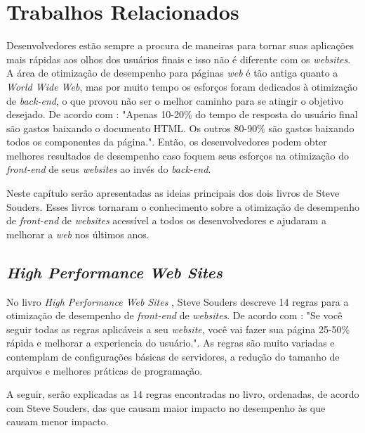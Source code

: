 %
%

\chapter{Trabalhos Relacionados}
Desenvolvedores estão sempre a procura de maneiras para tornar suas aplicações mais rápidas aos olhos dos usuários finais e isso não é diferente com os \textit{websites}. A área de otimização de desempenho para páginas \textit{web} é tão antiga quanto a \textit{World Wide Web}, mas por muito tempo os esforços foram dedicados à otimização de \textit{back-end}, o que \cite{HighPerformance} provou não ser o melhor caminho para se atingir o objetivo desejado. De acordo com : "Apenas 10-20\% do tempo de resposta do usuário final são gastos baixando o documento HTML. Os outros 80-90\% são gastos baixando todos os componentes da página.". Então, os desenvolvedores podem obter melhores resultados de desempenho caso foquem seus esforços na otimização do \textit{front-end} de seus \textit{websites} ao invés do \textit{back-end}.

Neste capítulo serão apresentadas as ideias principais dos dois livros  de Steve Souders. Esses livros tornaram o conhecimento sobre a otimização de desempenho de \textit{front-end} de \textit{websites} acessível a todos os desenvolvedores e ajudaram a melhorar a \textit{web} nos últimos anos.

\section{\textit{High Performance Web Sites}}
\label{sec:highperformancewebsites}

No livro \textit{High Performance Web Sites} \cite{HighPerformance}, Steve Souders descreve 14 regras para a otimização de desempenho de \textit{front-end} de \textit{websites}. De acordo com : "Se você seguir todas as regras aplicáveis a seu \textit{website}, você vai fazer sua página 25-50\% rápida e melhorar a experiencia do usuário.". As regras são muito variadas e contemplam de configurações básicas de servidores, a redução do tamanho de arquivos e melhores práticas de programação.

A seguir, serão explicadas as 14 regras encontradas no livro, ordenadas, de acordo com Steve Souders, das que causam maior impacto no desempenho às que causam menor impacto.

